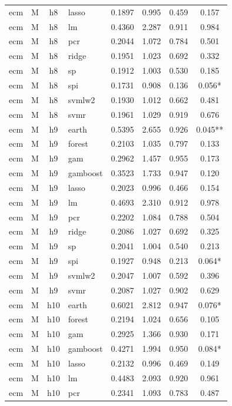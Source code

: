 \begin{ThreePartTable}
\begin{longtable}[t]{llclcccc}
ecm & M & h8 & lasso & 0.1897 & 0.995 & 0.459 & 0.157\\
ecm & M & h8 & lm & 0.4360 & 2.287 & 0.911 & 0.984\\
ecm & M & h8 & pcr & 0.2044 & 1.072 & 0.784 & 0.501\\
ecm & M & h8 & ridge & 0.1951 & 1.023 & 0.692 & 0.332\\
ecm & M & h8 & sp & 0.1912 & 1.003 & 0.530 & 0.185\\
ecm & M & h8 & spi & 0.1731 & 0.908 & 0.136 & 0.056*\\
ecm & M & h8 & svmlw2 & 0.1930 & 1.012 & 0.662 & 0.481\\
ecm & M & h8 & svmr & 0.1961 & 1.029 & 0.919 & 0.676\\
\addlinespace
ecm & M & h9 & earth & 0.5395 & 2.655 & 0.926 & 0.045**\\
ecm & M & h9 & forest & 0.2103 & 1.035 & 0.797 & 0.133\\
ecm & M & h9 & gam & 0.2962 & 1.457 & 0.955 & 0.173\\
ecm & M & h9 & gamboost & 0.3523 & 1.733 & 0.947 & 0.120\\
ecm & M & h9 & lasso & 0.2023 & 0.996 & 0.466 & 0.154\\
ecm & M & h9 & lm & 0.4693 & 2.310 & 0.912 & 0.978\\
ecm & M & h9 & pcr & 0.2202 & 1.084 & 0.788 & 0.504\\
ecm & M & h9 & ridge & 0.2086 & 1.027 & 0.692 & 0.325\\
ecm & M & h9 & sp & 0.2041 & 1.004 & 0.540 & 0.213\\
ecm & M & h9 & spi & 0.1927 & 0.948 & 0.213 & 0.064*\\
ecm & M & h9 & svmlw2 & 0.2047 & 1.007 & 0.592 & 0.396\\
ecm & M & h9 & svmr & 0.2087 & 1.027 & 0.902 & 0.629\\
\addlinespace
ecm & M & h10 & earth & 0.6021 & 2.812 & 0.947 & 0.076*\\
ecm & M & h10 & forest & 0.2194 & 1.024 & 0.656 & 0.105\\
ecm & M & h10 & gam & 0.2925 & 1.366 & 0.930 & 0.171\\
ecm & M & h10 & gamboost & 0.4271 & 1.994 & 0.950 & 0.084*\\
ecm & M & h10 & lasso & 0.2132 & 0.996 & 0.469 & 0.149\\
ecm & M & h10 & lm & 0.4483 & 2.093 & 0.920 & 0.961\\
ecm & M & h10 & pcr & 0.2341 & 1.093 & 0.783 & 0.487\\

\end{longtable}
\end{ThreePartTable}

